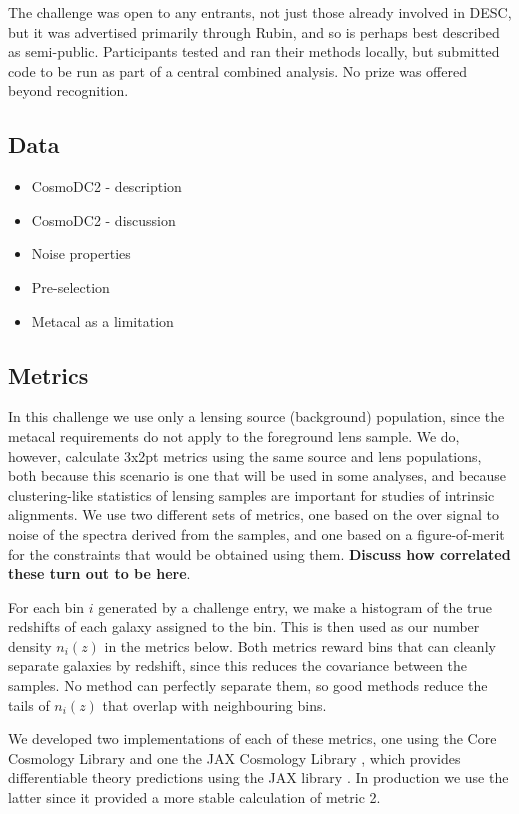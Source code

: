 \documentclass[twocolumn,twocolappendix]{aastex63}
\begin{document}
The challenge was open to any entrants, not just those already involved in DESC, but it was
advertised primarily through Rubin, and so is perhaps best described as semi-public.
Participants tested and ran their methods locally, but submitted code to be run as part of a central
combined analysis.  No prize was offered beyond recognition.


\subsection{Data}
\label{sec:data}


\begin{itemize}
    \item CosmoDC2 - description
    \item CosmoDC2 - discussion
    \item Noise properties
    \item Pre-selection 
    \item Metacal as a limitation
\end{itemize}

\subsection{Metrics}
\label{sec:metrics}

In this challenge we use only a lensing source (background) population, since the metacal requirements
do not apply to the foreground lens sample. We do, however, calculate 3x2pt metrics using the
same source and lens populations, both because this scenario is one that will be used in some analyses,
and because clustering-like statistics of lensing samples are important for studies of intrinsic
alignments. We use two different sets of metrics, one based on the over signal to noise of the spectra 
derived from the samples, and one based on a figure-of-merit for the constraints that would be obtained 
using them.  \textbf{Discuss how correlated these turn out to be here}.  

For each bin $i$ generated by a challenge entry, we make a histogram of the true redshifts 
of each galaxy assigned to the bin.  This is then used as our number density $n_i(z)$ in the metrics 
below. Both metrics reward bins that can
cleanly separate galaxies by redshift, since this reduces the covariance between the samples. No
method can perfectly separate them, so good methods reduce the tails of $n_i(z)$ that overlap with 
neighbouring bins.

We developed two implementations of each of these metrics, one using the Core Cosmology Library 
\citep{ccl} and one the JAX Cosmology Library \citep{jax-cosmo}, which provides differentiable theory 
predictions using the JAX library \citep{jax}.  In production we use the latter since it provided a
more stable calculation of metric 2.
\end{document}
